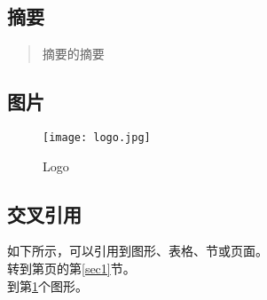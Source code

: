 \documentclass[12pt]{article}
\begin{document}
\subsection{摘要}
\begin{abstract}
    摘要的摘要\label{abs}
\end{abstract}
\subsection{图片}
\begin{figure}[!htp]
    \centering
    \texttt{[image: logo.jpg]}
    \caption{Logo}\label{logo}
\end{figure} %
\subsection{交叉引用}
如下所示，可以引用到图形、表格、节或页面。\\
转到第\pageref{sec1}页的第\ref{sec1}节。\\
到第\ref{logo}个图形。
\end{document}
